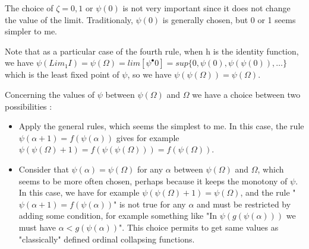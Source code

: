 \documentclass[10pt]{article}
\begin{document}
The choice of \( \zeta = 0, 1 \) or \( \psi(0) \) is not very important since it does not change the value of the limit. Traditionaly, \( \psi(0) \) is generally chosen, but 0 or 1 seems simpler to me.

Note that as a particular case of the fourth rule, when h is the identity function, we have \( \psi(Lim_1 I) = \psi(\Omega) = lim [ {\psi}^\bullet 0 ] = sup \lbrace 0, \psi(0), \psi(\psi(0)), \ldots \rbrace \) which is the least fixed point of \( \psi \), so we have \( \psi(\psi(\Omega)) = \psi(\Omega) \).

\bigskip

Concerning the values of \( \psi \) between \( \psi(\Omega) \) and \( \Omega \) we have a choice between two possibilities : 

\begin{itemize}
     \setlength{\itemsep}{1pt}
     \setlength{\parskip}{0pt}
     \setlength{\parsep}{0pt}

\item Apply the general rules, which seems the simplest to me. In this case, the rule \( \psi(\alpha+1) = f(\psi(\alpha)) \) gives for example \( \psi(\psi(\Omega)+1) = f(\psi(\psi(\Omega))) = f(\psi(\Omega)) \).

\item Consider that \( \psi(\alpha) = \psi(\Omega) \) for any \( \alpha \) between \( \psi(\Omega) \) and \( \Omega \), which seems to be more often chosen, perhaps because it keeps the monotony of \( \psi \). In this case, we have for example \( \psi(\psi(\Omega)+1) = \psi(\Omega) \), and the rule "\( \psi(\alpha+1) = f(\psi(\alpha)) \)" is not true for any \( \alpha \) and must be restricted by adding some condition, for example something like "In \(\psi(g(\psi(\alpha))) \) we must have \( \alpha < g(\psi(\alpha)) \)". This choice permits to get same values as "classically" defined ordinal collapsing functions.

\end{itemize}

\begin{comment}
Concerning the values of \( \psi \) between \( \psi(\Omega) \) and \( \Omega \), some authors consider that it is \( \psi(\Omega) \), which implies that the rule \( \psi(suc\ \alpha) = f(\psi(\alpha)) \) is not true for any \( \alpha \) and must be restricted by adding some condition like "In \( \psi(g(\alpha)) \), we must have \( \alpha < g(\psi(\alpha)) \), but it seems simpler to me to consider that the rule \( \psi(suc\ \alpha) = f(\psi(\alpha)) \) is always true, which implies for example that \( \psi(suc \psi(\Omega)) = f(\psi(\psi(\Omega)) = f(\psi(\Omega)) \).
\end{comment}
\end{document}
